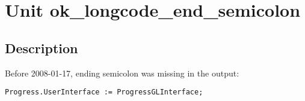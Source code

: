 \documentclass{report}
\begin{document}
\newlength{\tmplength}
\chapter{Unit ok{\_}longcode{\_}end{\_}semicolon}
\section{Description}
Before 2008{-}01{-}17, ending semicolon was missing in the output:

\texttt{Progress.UserInterface~:=~ProgressGLInterface;\\
}
\end{document}
